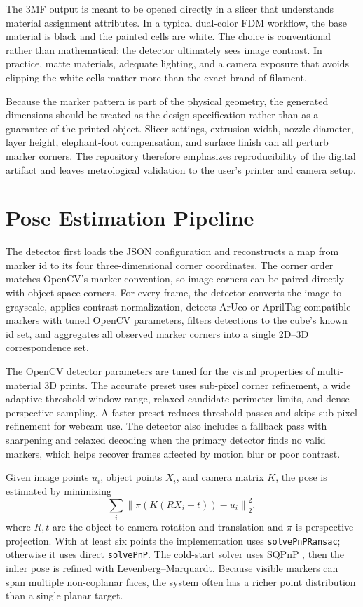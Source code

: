 \documentclass[conference]{IEEEtran}
\begin{document}
The 3MF output is meant to be opened directly in a slicer that understands material assignment attributes. In a typical dual-color FDM workflow, the base material is black and the painted cells are white. The choice is conventional rather than mathematical: the detector ultimately sees image contrast. In practice, matte materials, adequate lighting, and a camera exposure that avoids clipping the white cells matter more than the exact brand of filament.

Because the marker pattern is part of the physical geometry, the generated dimensions should be treated as the design specification rather than as a guarantee of the printed object. Slicer settings, extrusion width, nozzle diameter, layer height, elephant-foot compensation, and surface finish can all perturb marker corners. The repository therefore emphasizes reproducibility of the digital artifact and leaves metrological validation to the user's printer and camera setup.

\section{Pose Estimation Pipeline}
The detector first loads the JSON configuration and reconstructs a map from marker id to its four three-dimensional corner coordinates. The corner order matches OpenCV's marker convention, so image corners can be paired directly with object-space corners. For every frame, the detector converts the image to grayscale, applies contrast normalization, detects ArUco or AprilTag-compatible markers with tuned OpenCV parameters, filters detections to the cube's known id set, and aggregates all observed marker corners into a single 2D--3D correspondence set.

The OpenCV detector parameters are tuned for the visual properties of multi-material 3D prints. The accurate preset uses sub-pixel corner refinement, a wide adaptive-threshold window range, relaxed candidate perimeter limits, and dense perspective sampling. A faster preset reduces threshold passes and skips sub-pixel refinement for webcam use. The detector also includes a fallback pass with sharpening and relaxed decoding when the primary detector finds no valid markers, which helps recover frames affected by motion blur or poor contrast.

Given image points \(u_i\), object points \(X_i\), and camera matrix \(K\), the pose is estimated by minimizing
\begin{equation}
\sum_i \left\|\pi\left(K(RX_i+t)\right)-u_i\right\|_2^2,
\end{equation}
where \(R,t\) are the object-to-camera rotation and translation and \(\pi\) is perspective projection. With at least six points the implementation uses \texttt{solvePnPRansac}; otherwise it uses direct \texttt{solvePnP}. The cold-start solver uses SQPnP \cite{sqpnp}, then the inlier pose is refined with Levenberg--Marquardt. Because visible markers can span multiple non-coplanar faces, the system often has a richer point distribution than a single planar target.
\end{document}
